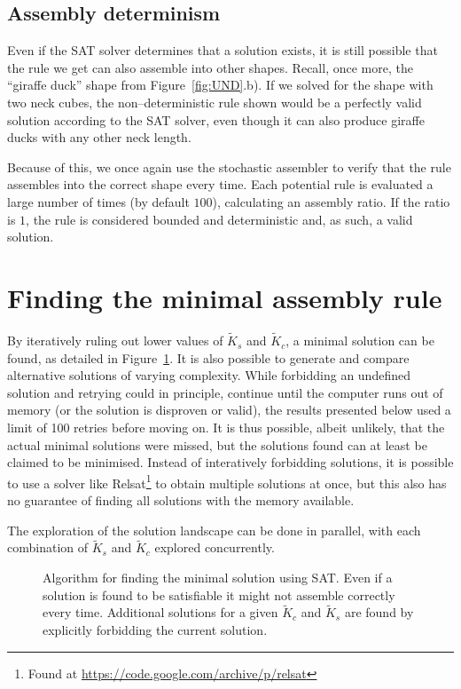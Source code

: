 \subsection{Assembly determinism}
Even if the SAT solver determines that a solution exists, it is still possible that the rule we get can also assemble into other shapes. Recall, once more, the ``giraffe duck'' shape from Figure~\ref{fig:UND}.b). If we solved for the shape with two neck cubes, the non--deterministic rule shown would be a perfectly valid solution according to the SAT solver, even though it can also produce giraffe ducks with any other neck length.

Because of this, we once again use the stochastic assembler to verify that the rule assembles into the correct shape every time. Each potential rule is evaluated a large number of times (by default \(100\)), calculating an assembly ratio. If the ratio is \(1\), the rule is considered bounded and deterministic and, as such, a valid solution.


\section{Finding the minimal assembly rule}

By iteratively ruling out lower values of \(\widetilde{K}_s\) and \(\widetilde{K}_c\), a minimal solution can be found, as detailed in Figure~\ref{fig:sat_alg}. It is also possible to generate and compare alternative solutions of varying complexity. While forbidding an undefined solution and retrying could in principle, continue until the computer runs out of memory (or the solution is disproven or valid), the results presented below used a limit of 100 retries before moving on. It is thus possible, albeit unlikely, that the actual minimal solutions were missed, but the solutions found can at least be claimed to be minimised. Instead of interatively forbidding solutions, it is possible to use a solver like Relsat\footnote{Found at \url{https://code.google.com/archive/p/relsat}} to obtain multiple solutions at once, but this also has no guarantee of finding all solutions with the memory available.

The exploration of the solution landscape can be done in parallel, with each combination of \(\widetilde{K}_s\) and \(\widetilde{K}_c\) explored concurrently.

\begin{figure}
    \centering
    \resizebox{\textwidth}{!}{}
    \caption{Algorithm for finding the minimal solution using SAT. Even if a solution is found to be satisfiable it might not assemble correctly every time. Additional solutions for a given \(\widetilde{K}_c\) and \(\widetilde{K}_s\) are found by explicitly forbidding the current solution. }
    \label{fig:sat_alg}
\end{figure}

